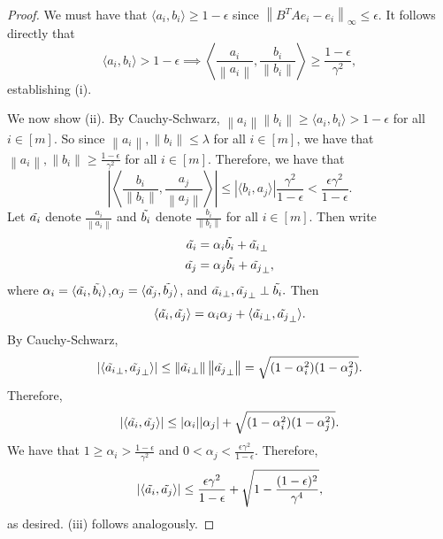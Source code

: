\documentclass[11pt]{article}
\newcommand{\norm}[1]{\left\|#1\right\|}
\begin{document}
\begin{proof}
    We must have that $\langle a_i, b_i\rangle \ge 1 - \epsilon$ since $\norm{B^TAe_i - e_i}_\infty \le \epsilon$. It follows directly that
    \begin{equation}
       \langle a_i, b_i \rangle > 1 - \epsilon \implies \left\langle\frac{a_i}{\norm{a_i}}, \frac{b_i}{\norm{b_i}}\right\rangle \ge \frac{1-\epsilon}{\gamma^2},
    \end{equation}
    establishing (i).

    We now show (ii). By Cauchy-Schwarz, $\norm{a_i}\norm{b_i} \ge \langle a_i, b_i\rangle > 1 - \epsilon$ for all $i\in [m]$. So since $\norm{a_i},\norm{b_i} \le \lambda$ for all $i\in [m]$, we have that $\norm{a_i},\norm{b_i}\ge \frac{1-\epsilon}{\gamma^2}$ for all $i\in [m]$. Therefore, we have that
    \begin{equation}
        \left|\left\langle \frac{b_i}{\norm{b_i}}, \frac{a_j}{\norm{a_j}}\right\rangle\right| \le |\langle b_i, a_j\rangle|\frac{\gamma^2}{1-\epsilon} < \frac{\epsilon\gamma^2}{1 - \epsilon}.
    \end{equation}
    Let $\Tilde{a_i}$ denote $\frac{a_i}{\norm{a_i}}$ and $\Tilde{b_i}$ denote $\frac{b_i}{\norm{b_i}}$ for all $i\in [m].$ Then write
    \begin{align}
        \Tilde{a_i} &= \alpha_i\Tilde{b_i} + \Tilde{a_i}_\perp\\
        \Tilde{a_j} &= \alpha_j\Tilde{b_i} + \Tilde{a_j}_\perp,
    \end{align}
    where $\alpha_i = \langle \Tilde{a_i}, \Tilde{b_i}\rangle$,$\alpha_j = \langle \Tilde{a_j}, \Tilde{b_j}\rangle$, and $\Tilde{a_i}_\perp, \Tilde{a_j}_\perp \perp \Tilde{b_i}.$ Then
    \begin{equation}
        \langle \Tilde{a_i}, \Tilde{a_j}\rangle = \alpha_i\alpha_j + \langle \Tilde{a_i}_\perp, \Tilde{a_j}_\perp\rangle.
    \end{equation}
    By Cauchy-Schwarz,
    \begin{equation}
        |\langle\Tilde{a_i}_\perp, \Tilde{a_j}_\perp\rangle| \le \norm{\Tilde{a_i}_\perp}\norm{\Tilde{a_j}_\perp} = \sqrt{(1 - \alpha_i^2)(1 - \alpha_j^2)}.
    \end{equation}
    Therefore,
    \begin{equation}
        |\langle \Tilde{a_i}, \Tilde{a_j}\rangle| \le |\alpha_i||\alpha_j| + \sqrt{(1 - \alpha_i^2)(1 - \alpha_j^2)}.
    \end{equation}
    We have that $1\ge \alpha_i > \frac{1 - \epsilon}{\gamma^2}$ and $0 < \alpha_j < \frac{\epsilon\gamma^2}{1 - \epsilon}.$ Therefore,
    \begin{equation}
        |\langle \Tilde{a_i}, \Tilde{a_j}\rangle| \le \frac{\epsilon\gamma^2}{1 - \epsilon} + \sqrt{1 - \frac{(1 - \epsilon)^2}{\gamma^4}},
    \end{equation}
    as desired.
    (iii) follows analogously.
\end{proof}
\end{document}
